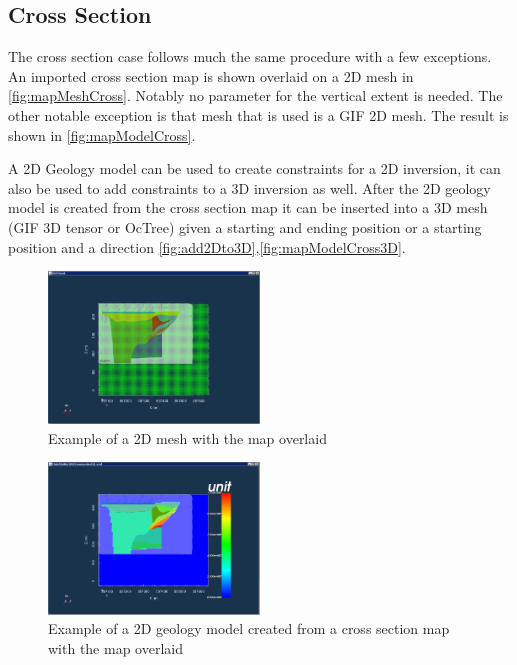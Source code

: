 \subsection{Cross Section}
\label{subsec:Make Geology Model from Map Cross Section}

The cross section case follows much the same procedure with a few exceptions. An imported cross section map is shown overlaid on a 2D mesh in \autoref{fig:mapMeshCross}. Notably no parameter for the vertical extent is needed. The other notable exception is that mesh that is used is a \ac{GIF} 2D mesh. The result is shown in \autoref{fig:mapModelCross}.  

A 2D Geology model can be used to create constraints for a 2D inversion, it can also be used to add constraints to a 3D inversion as well. After the 2D geology model is created from the cross section map it can be inserted into a 3D mesh (\ac{GIF} 3D tensor or OcTree) given a starting and ending position or a starting position and a direction \autoref{fig:add2Dto3D},\autoref{fig:mapModelCross3D}.

\begin{figure} [h]
    \centering
    \includegraphics[width=0.5\textwidth]{images/GUI/mapMeshCross.PNG}
    \caption{Example of a 2D mesh with the map overlaid}
    \label{fig:mapMeshCross}
\end{figure}

\begin{figure} [h]
    \centering
    \includegraphics[width=0.5\textwidth]{images/GUI/mapModelCross.PNG}
    \caption{Example of a 2D geology model created from a cross section map with the map overlaid}
    \label{fig:mapModelCross}
\end{figure}


